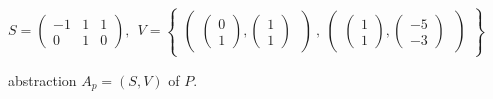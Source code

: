 
\begin{figure}[H]
\[
    S = \begin{pmatrix}
        -1 & 1 & 1 \\
        0 & 1 & 0
    \end{pmatrix}, \ \
    V = \begin{Bmatrix}
        \begin{pmatrix}
              \begin{pmatrix}
                    0 \\
                    1
               \end{pmatrix},
               \begin{pmatrix}
                     1 \\
                     1
               \end{pmatrix}
        \  \end{pmatrix}\ , \
        \begin{pmatrix}
               \begin{pmatrix}
                    1 \\
                    1
               \end{pmatrix},
               \begin{pmatrix}
                    -5 \\
                    -3
              \end{pmatrix}
        \ \end{pmatrix}
    \end{Bmatrix}
\]
\caption{\qvasr abstraction $A_p = (S, V)$ of $P$.}
\end{figure}